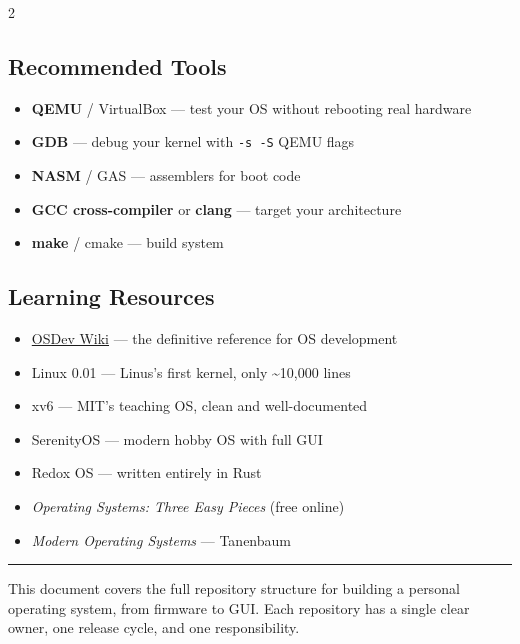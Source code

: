 2\documentclass[11pt,a4paper]{article}
\begin{document}
\subsection{Recommended Tools}
\begin{itemize}[noitemsep]
  \item \textbf{QEMU} / VirtualBox --- test your OS without rebooting real hardware
  \item \textbf{GDB} --- debug your kernel with \texttt{-s -S} QEMU flags
  \item \textbf{NASM} / GAS --- assemblers for boot code
  \item \textbf{GCC cross-compiler} or \textbf{clang} --- target your architecture
  \item \textbf{make} / cmake --- build system
\end{itemize}

\subsection{Learning Resources}
\begin{itemize}[noitemsep]
  \item \href{https://wiki.osdev.org}{OSDev Wiki} --- the definitive reference for OS development
  \item Linux 0.01 --- Linus's first kernel, only \textasciitilde{}10,000 lines
  \item xv6 --- MIT's teaching OS, clean and well-documented
  \item SerenityOS --- modern hobby OS with full GUI
  \item Redox OS --- written entirely in Rust
  \item \textit{Operating Systems: Three Easy Pieces} (free online)
  \item \textit{Modern Operating Systems} --- Tanenbaum
\end{itemize}

\vfill
\hrule
\vspace{0.3cm}
{\small\color{gray} This document covers the full repository structure for building a personal operating system, from firmware to GUI. Each repository has a single clear owner, one release cycle, and one responsibility.}
\end{document}
